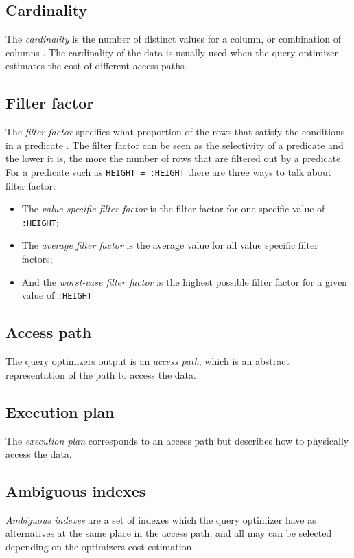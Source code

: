 \subsection*{Cardinality}
The \textit{cardinality} is the number of distinct values for a column, or combination of columns \cite{lahdenmaki_2005_relational_rdidatodossea}. The cardinality of the data is usually used when the query optimizer estimates the cost of different access paths.

\subsection*{Filter factor}
The \textit{filter factor} specifies what proportion of the rows that    satisfy the conditions in a predicate \cite{lahdenmaki_2005_relational_rdidatodossea}. The filter factor can be seen as the selectivity of a predicate and the lower it is, the more the number of rows that are filtered out by a predicate. For a predicate such as \texttt{HEIGHT = :HEIGHT} there are three ways to talk about filter factor:
\begin{itemize}
    \item The \textit{value specific filter factor} is the filter factor for one specific value of \texttt{:HEIGHT};
    \item The \textit{average filter factor} is the average value for all value specific filter factors;
    \item And the \textit{worst-case filter factor} is the highest possible filter factor for a given value of \texttt{:HEIGHT}
\end{itemize}

\subsection*{Access path}
The query optimizers output is an \textit{access path}, which is an abstract representation of the path to access the data.

\subsection*{Execution plan}
The \textit{execution plan} corresponds to an access path but describes how to physically access the data.

\subsection*{Ambiguous indexes}
\textit{Ambiguous indexes} are a set of indexes which the query optimizer have as alternatives at the same place in the access path, and all may can be selected depending on the optimizers cost estimation.